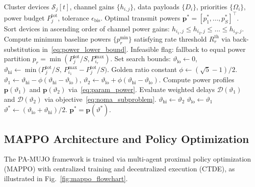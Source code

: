 \documentclass[journal]{IEEEtran}
\begin{document}
\begin{algorithm}[!t]
\caption{Analytical NOMA Power Allocation via Bisection}
\label{alg:noma_bisection}
\begin{algorithmic}[1]
\Require Cluster devices $\mathcal{S}_j[t]$, channel gains $\{h_{i,j}\}$, data payloads $\{D_i\}$, priorities $\{\Omega_i\}$, power budget $P_j^{\mathrm{tot}}$, tolerance $\epsilon_{\mathrm{bis}}$.
\Ensure Optimal transmit powers $\mathbf{p}^* = [p_1^*, \dots, p_S^*]^\top$.
\State Sort devices in ascending order of channel power gains: $h_{i_1, j} \le h_{i_2, j} \le \dots \le h_{i_S, j}$.
\State Compute minimum baseline powers $\{p_r^{\min}\}$ satisfying rate threshold $R_r^{\mathrm{th}}$ via back-substitution in~\eqref{eq:power_lower_bound}.
    \State \Return Infeasible flag: fallback to equal power partition $p_r = \min(P_j^{\mathrm{tot}}/S, P_{i_r}^{\max})$.
\EndIf
\State Set search bounds: $\vartheta_{\mathrm{lo}} \gets 0$, $\vartheta_{\mathrm{hi}} \gets \min\bigl(P_j^{\mathrm{tot}}/S, \, P_{i_1}^{\max} - P_j^{\mathrm{tot}}/S\bigr)$.
\State Golden ratio constant $\phi \gets (\sqrt{5} - 1)/2$.
    \State $\vartheta_1 \gets \vartheta_{\mathrm{hi}} - \phi(\vartheta_{\mathrm{hi}} - \vartheta_{\mathrm{lo}})$, \quad $\vartheta_2 \gets \vartheta_{\mathrm{lo}} + \phi(\vartheta_{\mathrm{hi}} - \vartheta_{\mathrm{lo}})$.
    \State Compute power profiles $\mathbf{p}(\vartheta_1)$ and $\mathbf{p}(\vartheta_2)$ via~\eqref{eq:param_power}.
    \State Evaluate weighted delays $\mathcal{D}(\vartheta_1)$ and $\mathcal{D}(\vartheta_2)$ via objective~\eqref{eq:noma_subproblem}.
        \State $\vartheta_{\mathrm{hi}} \gets \vartheta_2$
    \Else
        \State $\vartheta_{\mathrm{lo}} \gets \vartheta_1$
    \EndIf
\EndWhile
\State $\vartheta^* \gets (\vartheta_{\mathrm{lo}} + \vartheta_{\mathrm{hi}})/2$.
\State \Return $\mathbf{p}^* = \mathbf{p}(\vartheta^*)$.
\end{algorithmic}
\end{algorithm}

\subsection{MAPPO Architecture and Policy Optimization}
\label{sec:mappo_arch}

The PA-MUJO framework is trained via multi-agent proximal policy optimization (MAPPO) with centralized training and decentralized execution (CTDE), as illustrated in Fig.~\ref{fig:mappo_flowchart}.
\end{document}
